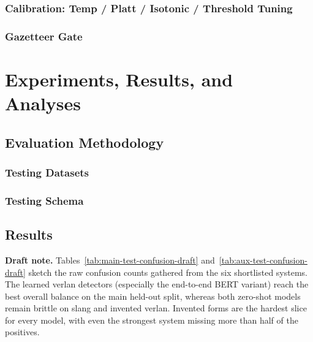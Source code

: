 \documentclass[12pt]{article}
\begin{document}
\subsubsection{Calibration: Temp / Platt / Isotonic / Threshold Tuning}
\subsubsection{Gazetteer Gate}

\section{Experiments, Results, and Analyses}

\subsection{Evaluation Methodology}
\subsubsection{Testing Datasets}
\subsubsection{Testing Schema}

\subsection{Results}
\textbf{Draft note.} Tables~\ref{tab:main-test-confusion-draft} and~\ref{tab:aux-test-confusion-draft} sketch the raw confusion counts gathered from the six shortlisted systems.  The learned verlan detectors (especially the end-to-end BERT variant) reach the best overall balance on the main held-out split, whereas both zero-shot models remain brittle on slang and invented verlan.  Invented forms are the hardest slice for every model, with even the strongest system missing more than half of the positives.
\end{document}
